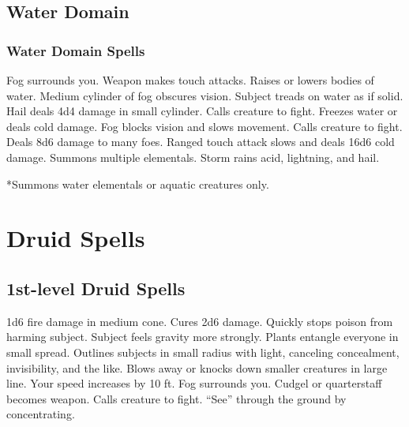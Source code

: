 \subsection{Water Domain}
\subsubsection{Water Domain Spells}
\begin{spelllist}
   Fog surrounds you.
  \spellhead[1]{}
   Weapon makes touch attacks. 
   Raises or lowers bodies of water.
   Medium cylinder of fog obscures vision.
  \spellhead[3]{}
   Subject treads on water as if solid.
   Hail deals 4d4 damage in small cylinder.
   Calls creature to fight.
  \spellhead[5]{}
  \spellhead[5]{}
   Freezes water or deals cold damage.
   Fog blocks vision and slows movement.
  \spellhead[7]{}
   Calls creature to fight.
   Deals 8d6 damage to many foes.
   Ranged touch attack slows and deals 16d6 cold damage.
   Summons multiple elementals.
   Storm rains acid, lightning, and hail.
\end{spelllist}
*Summons water elementals or aquatic creatures only.


\section{Druid Spells}\label{Druid Spells}

\subsection{1st-level Druid Spells}
\begin{spelllist}
   1d6 fire damage in medium cone.
   Cures 2d6 damage.
   Quickly stops poison from harming subject.
   Subject feels gravity more strongly.
   Plants entangle everyone in small spread.
   Outlines subjects in small radius with light, canceling concealment, invisibility, and the like.
   Blows away or knocks down smaller creatures in large line.
   Your speed increases by 10 ft.
   Fog surrounds you.
   Cudgel or quarterstaff becomes  weapon.
   Calls creature to fight.
   ``See'' through the ground by concentrating.
\end{spelllist}

